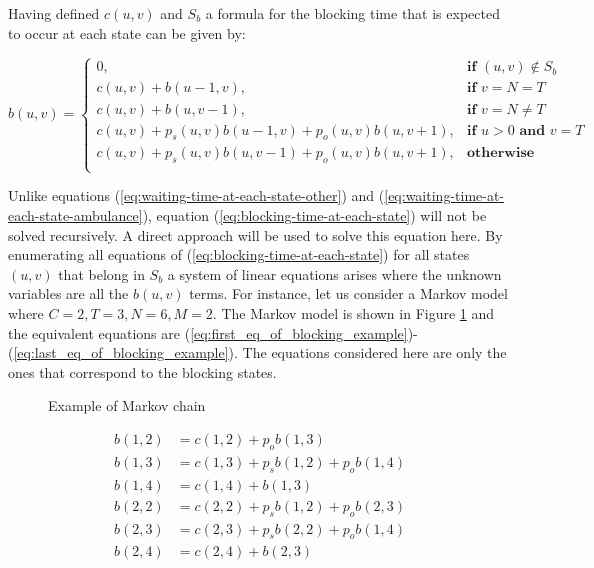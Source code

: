 Having defined \(c(u,v)\) and \(S_b\) a formula for the blocking time that is
expected to occur at each state can be given by:

\begin{equation}\label{eq:blocking-time-at-each-state}
    b(u,v) = 
    \begin{cases} 
        0, & \textbf{if } (u,v) \notin S_b \\
        c(u,v) + b(u - 1, v), & \textbf{if } v = N = T\\
        c(u,v) + b(u, v-1), & \textbf{if } v = N \neq T \\
        c(u,v) + p_s(u,v) b(u-1, v) + p_o(u,v) b(u, v+1), & \textbf{if } u > 0 
        \textbf{ and } v = T \\
        c(u,v) + p_s(u,v) b(u, v-1) + p_o(u,v) b(u, v+1), & \textbf{otherwise} \\
    \end{cases}
\end{equation}

Unlike equations (\ref{eq:waiting-time-at-each-state-other}) and 
(\ref{eq:waiting-time-at-each-state-ambulance}), equation 
(\ref{eq:blocking-time-at-each-state}) will not be solved recursively. 
A direct approach will be used to solve this equation here. 
By enumerating all equations of (\ref{eq:blocking-time-at-each-state}) for all 
states \((u,v)\) that belong in \(S_b\) 
a system of linear equations arises where the unknown variables are all the \(b(u,v)\)
terms.
For instance, let us consider a Markov model where \(C=2, T=3, N=6, M=2\). 
The Markov model is shown in Figure \ref{fig:example-algeb-blocking}
and the equivalent equations are 
(\ref{eq:first_eq_of_blocking_example})-(\ref{eq:last_eq_of_blocking_example}).
The equations considered here are only the ones that correspond to the blocking 
states.

\begin{multicols*}{2}
    \begin{figure}[H]
        \scalebox{0.50}{}
        \caption{Example of Markov chain}
        \label{fig:example-algeb-blocking}
    \end{figure}
    \columnbreak
    \begin{align}
        b(1,2) &= c(1,2) + p_o b(1,3) \label{eq:first_eq_of_blocking_example} \\
        b(1,3) &= c(1,3) + p_s b(1,2) + p_o b(1,4) \\
        b(1,4) &= c(1,4) + b(1,3) \\
        b(2,2) &= c(2,2) + p_s b(1,2) + p_o b(2,3) \\
        b(2,3) &= c(2,3) + p_s b(2,2) + p_o b(1,4) \\
        b(2,4) &= c(2,4) + b(2,3)\label{eq:last_eq_of_blocking_example}
    \end{align}
\end{multicols*}


